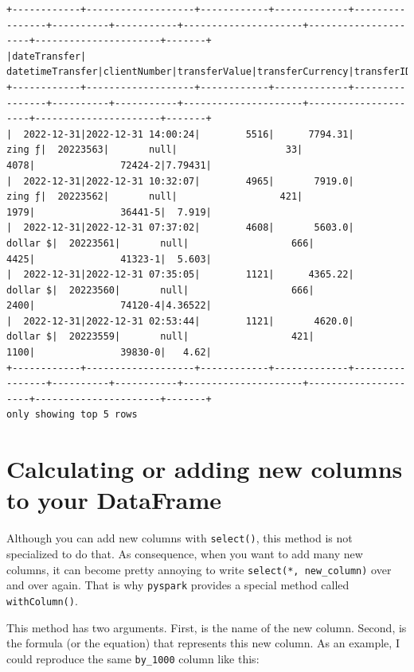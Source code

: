 \documentclass[
  11pt,
  letterpaper,
  DIV=11,
  numbers=noendperiod]{scrreprt}
\begin{document}
\begin{verbatim}
+------------+-------------------+------------+-------------+----------------+----------+-----------+---------------------+---------------------+----------------------+-------+
|dateTransfer|   datetimeTransfer|clientNumber|transferValue|transferCurrency|transferID|transferLog|destinationBankNumber|destinationBankBranch|destinationBankAccount|by_1000|
+------------+-------------------+------------+-------------+----------------+----------+-----------+---------------------+---------------------+----------------------+-------+
|  2022-12-31|2022-12-31 14:00:24|        5516|      7794.31|          zing ƒ|  20223563|       null|                   33|                 4078|               72424-2|7.79431|
|  2022-12-31|2022-12-31 10:32:07|        4965|       7919.0|          zing ƒ|  20223562|       null|                  421|                 1979|               36441-5|  7.919|
|  2022-12-31|2022-12-31 07:37:02|        4608|       5603.0|        dollar $|  20223561|       null|                  666|                 4425|               41323-1|  5.603|
|  2022-12-31|2022-12-31 07:35:05|        1121|      4365.22|        dollar $|  20223560|       null|                  666|                 2400|               74120-4|4.36522|
|  2022-12-31|2022-12-31 02:53:44|        1121|       4620.0|        dollar $|  20223559|       null|                  421|                 1100|               39830-0|   4.62|
+------------+-------------------+------------+-------------+----------------+----------+-----------+---------------------+---------------------+----------------------+-------+
only showing top 5 rows
\end{verbatim}

\hypertarget{calculating-or-adding-new-columns-to-your-dataframe}{%
\section{Calculating or adding new columns to your
DataFrame}\label{calculating-or-adding-new-columns-to-your-dataframe}}

Although you can add new columns with \texttt{select()}, this method is
not specialized to do that. As consequence, when you want to add many
new columns, it can become pretty annoying to write
\texttt{select(\textquotesingle{}*\textquotesingle{},\ new\_column)}
over and over again. That is why \texttt{pyspark} provides a special
method called \texttt{withColumn()}.

This method has two arguments. First, is the name of the new column.
Second, is the formula (or the equation) that represents this new
column. As an example, I could reproduce the same \texttt{by\_1000}
column like this:
\end{document}
